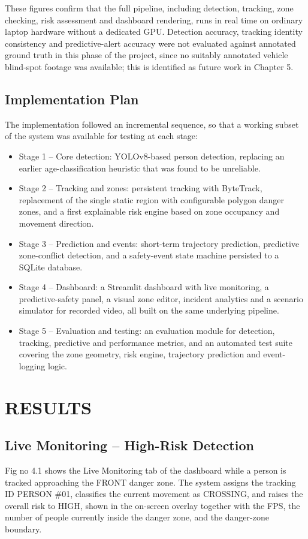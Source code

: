 \documentclass[12pt,a4paper]{report}
\begin{document}
These figures confirm that the full pipeline, including detection, tracking, zone checking, risk assessment and dashboard rendering, runs in real time on ordinary laptop hardware without a dedicated GPU. Detection accuracy, tracking identity consistency and predictive-alert accuracy were not evaluated against annotated ground truth in this phase of the project, since no suitably annotated vehicle blind-spot footage was available; this is identified as future work in Chapter 5.

\section{Implementation Plan}
The implementation followed an incremental sequence, so that a working subset of the system was available for testing at each stage:
\begin{itemize}[leftmargin=*,itemsep=2pt]
\item Stage 1 -- Core detection: YOLOv8-based person detection, replacing an earlier age-classification heuristic that was found to be unreliable.
\item Stage 2 -- Tracking and zones: persistent tracking with ByteTrack, replacement of the single static region with configurable polygon danger zones, and a first explainable risk engine based on zone occupancy and movement direction.
\item Stage 3 -- Prediction and events: short-term trajectory prediction, predictive zone-conflict detection, and a safety-event state machine persisted to a SQLite database.
\item Stage 4 -- Dashboard: a Streamlit dashboard with live monitoring, a predictive-safety panel, a visual zone editor, incident analytics and a scenario simulator for recorded video, all built on the same underlying pipeline.
\item Stage 5 -- Evaluation and testing: an evaluation module for detection, tracking, predictive and performance metrics, and an automated test suite covering the zone geometry, risk engine, trajectory prediction and event-logging logic.
\end{itemize}

\chapter{RESULTS}

\section{Live Monitoring -- High-Risk Detection}
Fig no 4.1 shows the Live Monitoring tab of the dashboard while a person is tracked approaching the FRONT danger zone. The system assigns the tracking ID PERSON \#01, classifies the current movement as CROSSING, and raises the overall risk to HIGH, shown in the on-screen overlay together with the FPS, the number of people currently inside the danger zone, and the danger-zone boundary.
\end{document}
